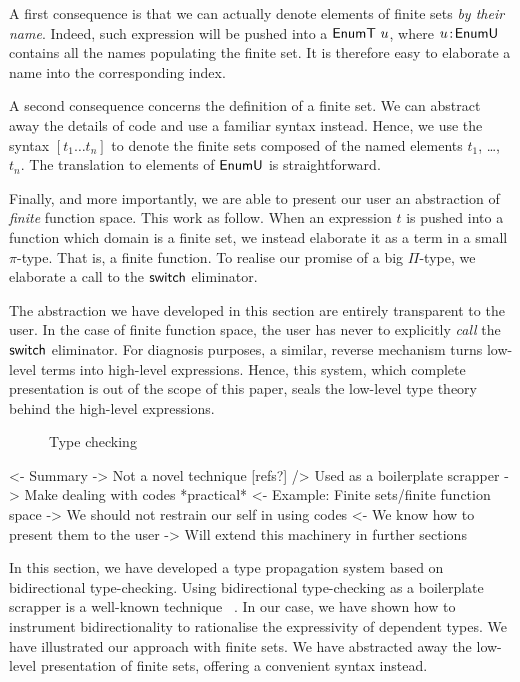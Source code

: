 A first consequence is that we can actually denote elements of finite
sets \emph{by their name}. Indeed, such expression will be pushed into
a $\EnumT{u}$, where $\Bhab{u}{\EnumU}$ contains all the names
populating the finite set. It is therefore easy to elaborate a name
into the corresponding index.

A second consequence concerns the definition of a finite set. We can
abstract away the details of code and use a familiar syntax
instead. Hence, we use the syntax $[t_1 \ldots t_n]$ to denote the
finite sets composed of the named elements $t_1$, \ldots, $t_n$. The
translation to elements of $\EnumU$ is straightforward.


Finally, and more importantly, we are able to present our user an
abstraction of \emph{finite} function space. This work as follow. When
an expression $t$ is pushed into a function which domain is a finite
set, we instead elaborate it as a term in a small $\pi$-type. That is,
a finite function. To realise our promise of a big $\Pi$-type, we
elaborate a call to the $\F{switch}$ eliminator. 

The abstraction we have developed in this section are entirely
transparent to the user. In the case of finite function space, the
user has never to explicitly \emph{call} the $\F{switch}$
eliminator. For diagnosis purposes, a similar, reverse mechanism turns
low-level terms into high-level expressions. Hence, this system, which
complete presentation is out of the scope of this paper, seals the
low-level type theory behind the high-level expressions.

\begin{figure}

\caption{Type checking}
\label{fig:type-checking}
\end{figure}

\begin{wstructure}
<- Summary
    -> Not a novel technique [refs?]
        /> Used as a boilerplate scrapper
    -> Make dealing with codes *practical*
        <- Example: Finite sets/finite function space
        -> We should not restrain our self in using codes
            <- We know how to present them to the user
-> Will extend this machinery in further sections
\end{wstructure}

In this section, we have developed a type propagation system based on
bidirectional type-checking. Using bidirectional type-checking as a
boilerplate scrapper is a well-known technique~\cite{who?} . In our case, we have shown how to instrument
bidirectionality to rationalise the expressivity of dependent
types. We have illustrated our approach with finite sets. We have
abstracted away the low-level presentation of finite sets, offering a
convenient syntax instead.

